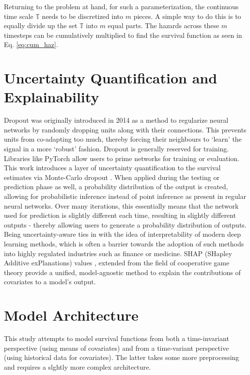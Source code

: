 \documentclass[%
 twocolumn,
 reprint,
 amsmath,amssymb,
 aps,nofootinbib
]{revtex4-2}
\begin{document}
Returning to the problem at hand, for such a parameterization, the continuous time scale $\mathbb{T}$ needs to be discretized into $m$ pieces. A simple way to do this is to equally divide up the set $\mathbb{T}$ into $m$ equal parts. The hazards across these $m$ timesteps can be cumulatively multiplied to find the survival function as seen in Eq. \ref{eq:cum_haz}. 

\section{\label{UQ_explain}Uncertainty Quantification and Explainability}
Dropout was originally introduced in 2014 \cite{dropout} as a method to regularize neural networks by randomly dropping units along with their connections. This prevents units from co-adapting too much, thereby forcing their neighbours to `learn' the signal in a more `robust' fashion. Dropout is generally reserved for training. Libraries like PyTorch allow users to prime networks for training or evaluation.\\

This work introduces a layer of uncertainty quantification to the survival estimates via Monte-Carlo dropout \cite{mcdropout}. When applied during the testing or prediction phase as well, a probability distribution of the output is created, allowing for probabilistic inference instead of point inference as present in regular neural networks. Over many iterations, this essentially means that the network used for prediction is slightly different each time, resulting in slightly different outputs - thereby allowing users to generate a probability distribution of outputs.\\

Being uncertainty-aware ties in with the idea of interpretability of modern deep learning methods, which is often a barrier towards the adoption of such methods into highly regulated industries such as finance or medicine. SHAP (SHapley Additive exPlanations) values \cite{shap}, extended from the field of cooperative game theory provide a unified, model-agnostic method to explain the contributions of covariates to a model's output.

\section{\label{model_arch}Model Architecture}
This study attempts to model survival functions from both a time-invariant perspective (using means of covariates) and from a time-variant perspective (using historical data for covariates). The latter takes some more preprocessing and requires a slghtly more complex architecture.
\end{document}

